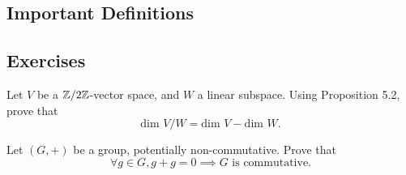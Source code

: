 \subsection{Important Definitions}

\subsection{Exercises}

\begin{exercise}
    Let $V$ be a $\mathbb{Z}/2\mathbb{Z}$-vector space, and $W$ a linear subspace. Using
    Proposition 5.2, prove that
    $$\text{dim } V /W = \text{dim } V - \text{dim } W  .$$
\end{exercise}



\begin{exercise}
    Let $(G, +)$ be a group, potentially non-commutative. Prove that
    $$\forall g \in G, g + g = 0 \implies G \text{ is commutative.}$$
\end{exercise}